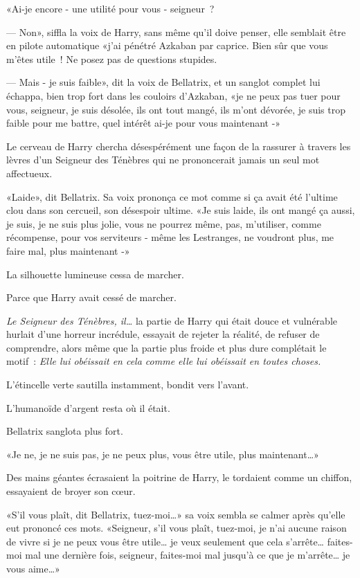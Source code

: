 «Ai-je encore - une utilité pour vous - seigneur~?

--- Non», siffla la voix de Harry, sans même qu'il doive penser, elle semblait être en pilote automatique «j'ai pénétré Azkaban par caprice. Bien sûr que vous m'êtes utile~! Ne posez pas de questions stupides.

--- Mais - je suis faible», dit la voix de Bellatrix, et un sanglot complet lui échappa, bien trop fort dans les couloirs d'Azkaban, «je ne peux pas tuer pour vous, seigneur, je suis désolée, ils ont tout mangé, ils m'ont dévorée, je suis trop faible pour me battre, quel intérêt ai-je pour vous maintenant -»

Le cerveau de Harry chercha désespérément une façon de la rassurer à travers les lèvres d'un Seigneur des Ténèbres qui ne prononcerait jamais un seul mot affectueux.

«Laide», dit Bellatrix. Sa voix prononça ce mot comme si ça avait été l'ultime clou dans son cercueil, son désespoir ultime. «Je suis laide, ils ont mangé ça aussi, je suis, je ne suis plus jolie, vous ne pourrez même, pas, m'utiliser, comme récompense, pour vos serviteurs - même les Lestranges, ne voudront plus, me faire mal, plus maintenant -»

La silhouette lumineuse cessa de marcher.

Parce que Harry avait cessé de marcher.

\emph{Le Seigneur des Ténèbres, il…} la partie de Harry qui était douce et vulnérable hurlait d'une horreur incrédule, essayait de rejeter la réalité, de refuser de comprendre, alors même que la partie plus froide et plus dure complétait le motif~: \emph{Elle lui obéissait en cela comme elle lui obéissait en toutes choses.}

L'étincelle verte sautilla instamment, bondit vers l'avant.

L'humanoïde d'argent resta où il était.

Bellatrix sanglota plus fort.

«Je ne, je ne suis pas, je ne peux plus, vous être utile, plus maintenant…»

Des mains géantes écrasaient la poitrine de Harry, le tordaient comme un chiffon, essayaient de broyer son cœur.

«S'il vous plaît, dit Bellatrix, tuez-moi…» sa voix sembla se calmer après qu'elle eut prononcé ces mots. «Seigneur, s'il vous plaît, tuez-moi, je n'ai aucune raison de vivre si je ne peux vous être utile… je veux seulement que cela s'arrête… faites-moi mal une dernière fois, seigneur, faites-moi mal jusqu'à ce que je m'arrête… je vous aime…»

